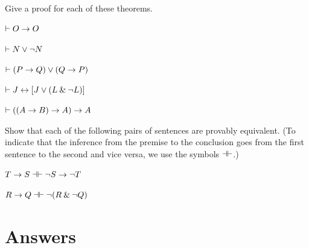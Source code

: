 \problempart
Give a proof for each of these theorems.
\begin{earg}
\item $\vdash O \rightarrow O$\smallskip
\item $\vdash N \vee {\neg} N$\smallskip
\item $\vdash (P \rightarrow Q) \vee (Q \rightarrow P)$\smallskip
\item $\vdash J \leftrightarrow [J\vee (L\mathbin{\&}{\neg} L)]$\smallskip
\item $\vdash ((A \rightarrow B) \rightarrow A) \rightarrow A$\smallskip 
\end{earg}


\problempart
Show that each of the following pairs of sentences are provably equivalent. (To indicate that the inference from the premise to the conclusion goes from the first sentence to the second and vice versa, we use the symbols $\dashv\vdash$.)
\begin{earg}
\item $T\rightarrow S \dashv\vdash {\neg} S \rightarrow {\neg} T$
\item $R \rightarrow Q \dashv\vdash {\neg}(R \mathbin{\&} {\neg} Q)$
\end{earg}



\section{Answers}
\setcounter{ProbPart}{0}


